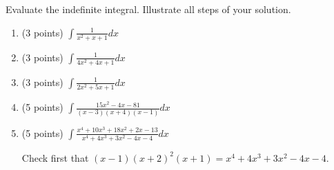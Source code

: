 Evaluate the indefinite integral. Illustrate all steps of your solution. 
\begin{enumerate}
\item (3 points) $\int \frac1{x^2+x+1}dx$
\item (3 points) $\int \frac1{4x^2+4x+1}dx$
\item (3 points) $\int \frac1{2x^2+5x+1}dx$
\item (5 points) $\int \frac{15x^2-4x-81}{(x-3)(x+4)(x-1)}dx$
\item (5 points) $\int \frac {x^{4}+10x^{3}+18x^{2}+2x-13}{x^{4}+4x^{3}+3x^{2}-4x-4}dx$ 

Check first that $(x-1)(x+2)^2(x+1)= x^{4}+4x^{3}+3x^{2}-4x-4$. \end{enumerate}